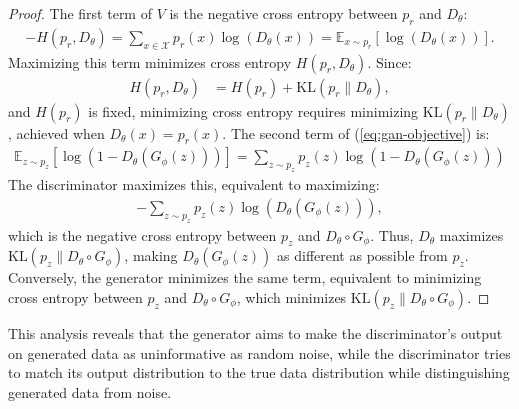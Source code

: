 \begin{proof}
	The first term of $V$ is the negative cross entropy between $p_r$ and $D_\theta$:
	\begin{align}
		\label{eq:neg-cross-entropy}
		- H(p_r, D_\theta) = \sum_{x \in \mathcal{X}} p_r(x)\log(D_\theta(x)) = \mathbb{E}_{x \sim p_r} [\log(D_\theta(x))].
	\end{align}
	Maximizing this term minimizes cross entropy $H(p_r, D_\theta)$. Since:
	\begin{align}
		H(p_r, D_\theta) & = H(p_r) + \text{KL}(p_r \| D_\theta),
	\end{align}
	and $H(p_r)$ is fixed, minimizing cross entropy requires minimizing $\text{KL}(p_r \| D_\theta)$, achieved when $D_\theta(x) = p_r(x)$.
	The second term of (\ref{eq:gan-objective}) is:
	\begin{align}
		\mathbb{E}_{z \sim p_z}[\log(1 - D_\theta(G_\phi(z)))] = \sum_{z \sim p_z} p_z(z) \log (1 - D_\theta(G_\phi(z)))
	\end{align}
	The discriminator maximizes this, equivalent to maximizing:
	\begin{align}
		-\sum_{z \sim p_z} p_z(z) \log (D_\theta(G_\phi(z))),
	\end{align}
	which is the negative cross entropy between $p_z$ and $D_\theta \circ G_\phi$. Thus, $D_\theta$ maximizes $\text{KL}(p_z \| D_\theta \circ G_\phi)$, making $D_\theta(G_\phi(z))$ as different as possible from $p_z$.
	Conversely, the generator minimizes the same term, equivalent to minimizing cross entropy between $p_z$ and $D_\theta \circ G_\phi$, which minimizes $\text{KL}(p_z \| D_\theta \circ G_\phi)$.
\end{proof}
This analysis reveals that the generator aims to make the discriminator's output on generated data as uninformative as random noise, while the discriminator tries to match its output distribution to the true data distribution while distinguishing generated data from noise.
